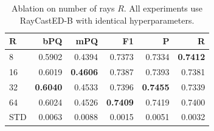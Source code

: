 \begin{table}[htbp]
\centering
\caption{Ablation on number of rays $R$. All experiments use RayCastED-B with identical hyperparameters.}
\label{tab:ablation-rays}
\begin{tabular}{l r r r r r}
\hline
$\boldsymbol{R}$ & \textbf{bPQ} & \textbf{mPQ} & \textbf{F1} & \textbf{P} & \textbf{R} \\
\hline
8  & 0.5902 & 0.4394 & 0.7373 & 0.7334 & \textbf{0.7412} \\
16 & 0.6019 & \textbf{0.4606} & 0.7387 & 0.7393 & 0.7381 \\
32 & \textbf{0.6040} & 0.4533 & 0.7396 & \textbf{0.7455} & 0.7339 \\
64 & 0.6024 & 0.4526 & \textbf{0.7409} & 0.7419 & 0.7400 \\
\hline
STD & 0.0063 & 0.0088 & 0.0015 & 0.0051 & 0.0032 \\
\hline
\end{tabular}
\end{table}
